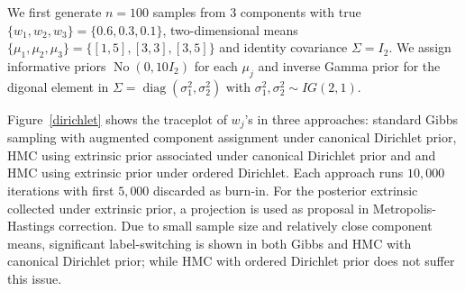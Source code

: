 \documentclass[10pt]{article}
\DeclareMathOperator{\No}{No}
\DeclareMathOperator{\diag}{diag}
\DeclareMathOperator{\1}{\mathbbm{1}}
\begin{document}
We first generate $n=100$ samples from $3$ components with true $\{w_1,w_2,w_3\}=\{0.6,0.3,0.1\}$, two-dimensional means $\{\mu_1,\mu_2,\mu_3\} = \{[1,5], [3,3], [3,5]\}$ and identity covariance $\Sigma = I_2$. We assign informative priors $\No(0,10 I_2)$ for each $\mu_j$ and inverse Gamma prior for the digonal element in $\Sigma=\diag(\sigma_1^2,\sigma_2^2)$ with $\sigma^2_1, \sigma^2_2\sim IG(2,1)$.  

Figure~\ref{dirichlet} shows the traceplot of $w_j$'s in three approaches: standard Gibbs sampling with augmented component assignment under canonical Dirichlet prior, HMC using extrinsic prior associated under canonical Dirichlet prior and and HMC using extrinsic prior under ordered Dirichlet. Each approach runs $10,000$ iterations with first $5,000$ discarded as burn-in. For the posterior extrinsic collected under extrinsic prior, a projection is used as proposal in Metropolis-Hastings correction. Due to small sample size and relatively close component means, significant label-switching is shown in both Gibbs and HMC with canonical Dirichlet prior; while HMC with ordered Dirichlet prior does not suffer this issue.
\end{document}
